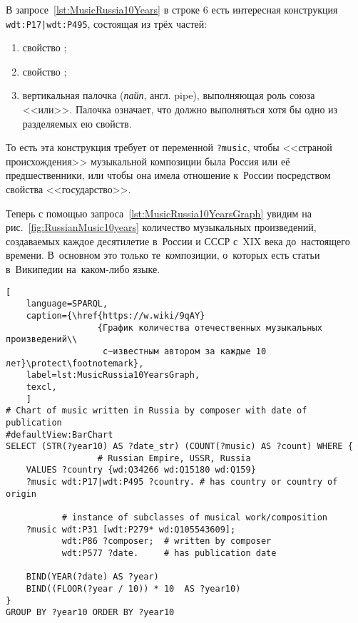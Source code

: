В запросе~\ref{lst:MusicRussia10Years} в строке 6 
есть интересная конструкция \lstinline{wdt:P17|wdt:P495}, состоящая из трёх частей:
\begin{enumerate}
\item свойство ; 
\item свойство ; 
\item вертикальная палочка (\emph{пайп}, англ. pipe), выполняющая роль союза <<или>>. 
    Палочка означает, что должно выполняться хотя бы одно из разделяемых ею свойств.
\end{enumerate}

То есть эта конструкция требует от переменной \lstinline|?music|, 
чтобы <<страной происхождения>> музыкальной композиции была Россия или её предшественники, 
или чтобы она имела отношение к~России посредством свойства <<государство>>. 

Теперь с помощью запроса~\ref{lst:MusicRussia10YearsGraph} увидим на рис.~\ref{fig:RussianMusic10years} 
количество музыкальных произведений, 
создаваемых каждое десятилетие в~России и СССР с~XIX века до~настоящего времени. 
В~основном это только те~композиции, о~которых есть статьи в~Википедии на~каком-либо языке. 


\begin{lstlisting}[ 
    language=SPARQL,
    caption={\href{https://w.wiki/9qAY}
                  {График количества отечественных музыкальных произведений\\
                   с~известным автором за каждые 10 лет}\protect\footnotemark},
    label=lst:MusicRussia10YearsGraph,
    texcl,
    ]
# Chart of music written in Russia by composer with date of publication
#defaultView:BarChart
SELECT (STR(?year10) AS ?date_str) (COUNT(?music) AS ?count) WHERE {
                  # Russian Empire, USSR, Russia
    VALUES ?country {wd:Q34266 wd:Q15180 wd:Q159}
    ?music wdt:P17|wdt:P495 ?country. # has country or country of origin  
    
           # instance of subclasses of musical work/composition
    ?music wdt:P31 [wdt:P279* wd:Q105543609];
           wdt:P86 ?composer;  # written by composer
           wdt:P577 ?date.     # has publication date
    
    BIND(YEAR(?date) AS ?year)
    BIND((FLOOR(?year / 10)) * 10  AS ?year10)
}
GROUP BY ?year10 ORDER BY ?year10
\end{lstlisting}%

